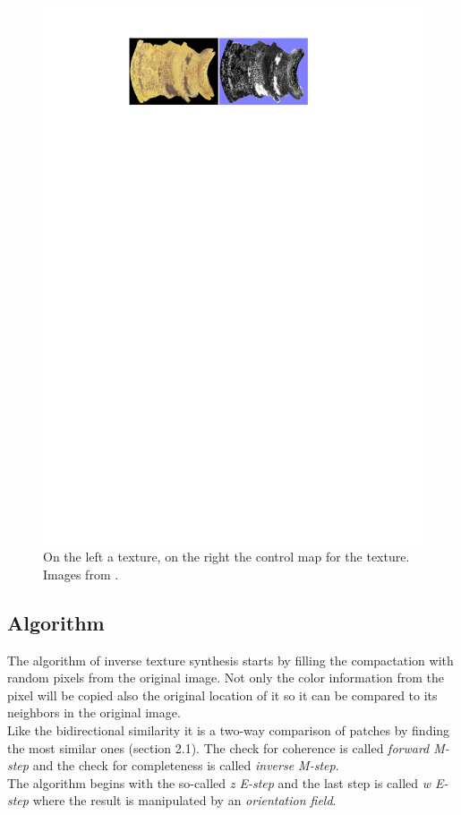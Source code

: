 \begin{figure}[h]
\centering
\includegraphics[scale=0.9]{img/controlmaps}
\caption[Control maps]{On the left a texture, on the right the control map for the texture.\\ Images from \cite{its}.}
\label{fig:Control maps}
\end{figure}


\subsection{Algorithm}
The algorithm of inverse texture synthesis starts by filling the compactation with random pixels from the original image. Not only the color information from the pixel will be copied also the original location of it so it can be compared to its neighbors in the original image.\\
Like the bidirectional similarity it is a two-way comparison of patches by finding the most similar ones (section 2.1). The check for coherence is called \textit{forward M-step} and the check for completeness is called \textit{inverse M-step}.\\
The algorithm begins with the so-called \textit{z E-step} and the last step is called \textit{w E-step} where the result is manipulated by an \textit{orientation field}.

